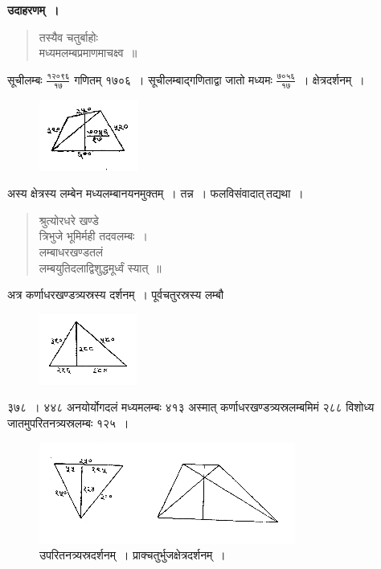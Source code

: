 \documentclass[11pt, openany]{book}
\begin{document}
 \textbf{उदाहरणम्~।} 
\begin{quote}
    \bqt 
तस्यैव चतुर्बाहोः\\
मध्यमलम्बप्रमाणमाचक्ष्व~॥
\end{quote}

 सूचीलम्बः $\frac{\mbox{१२०९६}}{\mbox{१७}}$ गणितम् १७०६~। सूचीलम्बाद्गणिताद्वा जातो मध्यमः
$\frac{\mbox{७०५६}}{\mbox{१७}}$~। क्षेत्रदर्शनम्~। 
\vspace{-2mm}

\begin{figure}[h!]
    \centering
    \includegraphics[scale=0.85]{graphics/capture69.png}
\end{figure}
\newpage
 अस्य क्षेत्रस्य लम्बेन मध्यलम्बानयनमुक्तम्~। तन्न~। फलविसंवादात्\textendash \,तद्यथा~। 
\begin{quote}
    \bs 
     श्रुत्योरधरे खण्डे \\
     त्रिभुजे भूमिर्मही तदवलम्बः~।\\
लम्बाधरखण्डतलं \\
लम्बयुतिदलाद्विशुद्धमूर्ध्वं स्यात्~॥
\end{quote}

 अत्र कर्णाधरखण्डत्र्यस्रस्य दर्शनम्~। पूर्वचतुरस्रस्य लम्बौ 
\vspace{-2mm}

\begin{figure}[h!]
    \centering
    \includegraphics[scale=0.85]{graphics/capture70.png}
\end{figure}
\vspace{-2mm}

 ३७८~। ४४८ अनयोर्योगदलं मध्यमलम्बः ४१३ अस्मात् कर्णाधरखण्डत्र्यस्रलम्बमिमं २८८ विशोध्य जातमुपरितनत्र्यस्रलम्बः १२५~। 

\begin{figure}[h!]
    \centering
   \captionsetup{labelformat=empty}
  \caption{\hspace{-0.8cm}उपरितनत्र्यस्रदर्शनम्~।\hspace{1.5cm} प्राक्चतुर्भुजक्षेत्रदर्शनम्~।}
\vspace{-4mm}

    \includegraphics[scale=0.85]{graphics/capture71.png}
\end{figure}
 
\end{document}
